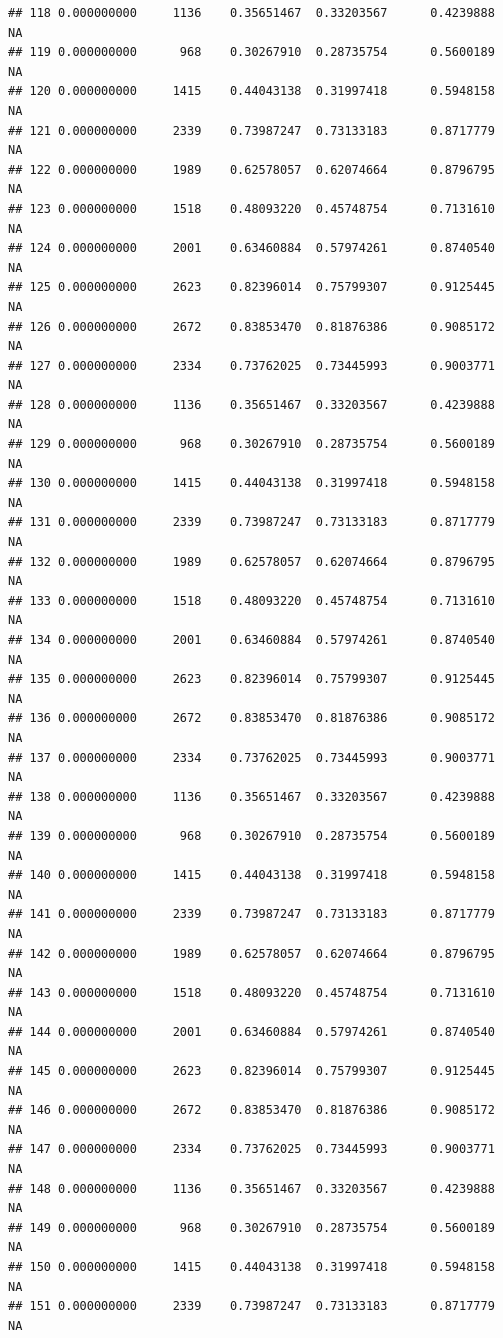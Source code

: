 \documentclass[
]{article}
\begin{document}
\begin{verbatim}
## 118 0.000000000     1136    0.35651467  0.33203567      0.4239888      NA
## 119 0.000000000      968    0.30267910  0.28735754      0.5600189      NA
## 120 0.000000000     1415    0.44043138  0.31997418      0.5948158      NA
## 121 0.000000000     2339    0.73987247  0.73133183      0.8717779      NA
## 122 0.000000000     1989    0.62578057  0.62074664      0.8796795      NA
## 123 0.000000000     1518    0.48093220  0.45748754      0.7131610      NA
## 124 0.000000000     2001    0.63460884  0.57974261      0.8740540      NA
## 125 0.000000000     2623    0.82396014  0.75799307      0.9125445      NA
## 126 0.000000000     2672    0.83853470  0.81876386      0.9085172      NA
## 127 0.000000000     2334    0.73762025  0.73445993      0.9003771      NA
## 128 0.000000000     1136    0.35651467  0.33203567      0.4239888      NA
## 129 0.000000000      968    0.30267910  0.28735754      0.5600189      NA
## 130 0.000000000     1415    0.44043138  0.31997418      0.5948158      NA
## 131 0.000000000     2339    0.73987247  0.73133183      0.8717779      NA
## 132 0.000000000     1989    0.62578057  0.62074664      0.8796795      NA
## 133 0.000000000     1518    0.48093220  0.45748754      0.7131610      NA
## 134 0.000000000     2001    0.63460884  0.57974261      0.8740540      NA
## 135 0.000000000     2623    0.82396014  0.75799307      0.9125445      NA
## 136 0.000000000     2672    0.83853470  0.81876386      0.9085172      NA
## 137 0.000000000     2334    0.73762025  0.73445993      0.9003771      NA
## 138 0.000000000     1136    0.35651467  0.33203567      0.4239888      NA
## 139 0.000000000      968    0.30267910  0.28735754      0.5600189      NA
## 140 0.000000000     1415    0.44043138  0.31997418      0.5948158      NA
## 141 0.000000000     2339    0.73987247  0.73133183      0.8717779      NA
## 142 0.000000000     1989    0.62578057  0.62074664      0.8796795      NA
## 143 0.000000000     1518    0.48093220  0.45748754      0.7131610      NA
## 144 0.000000000     2001    0.63460884  0.57974261      0.8740540      NA
## 145 0.000000000     2623    0.82396014  0.75799307      0.9125445      NA
## 146 0.000000000     2672    0.83853470  0.81876386      0.9085172      NA
## 147 0.000000000     2334    0.73762025  0.73445993      0.9003771      NA
## 148 0.000000000     1136    0.35651467  0.33203567      0.4239888      NA
## 149 0.000000000      968    0.30267910  0.28735754      0.5600189      NA
## 150 0.000000000     1415    0.44043138  0.31997418      0.5948158      NA
## 151 0.000000000     2339    0.73987247  0.73133183      0.8717779      NA

\end{verbatim}
\end{document}

